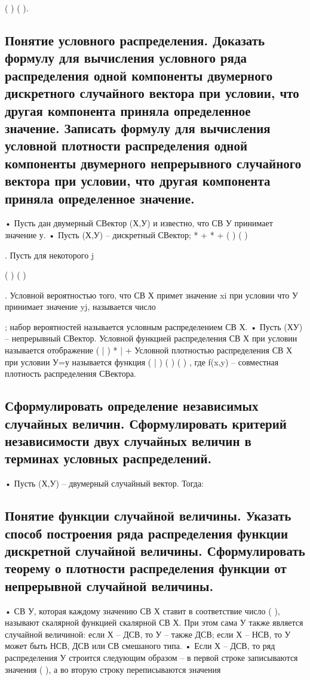 ( )
( ).

\subsection{Понятие условного распределения. Доказать формулу для вычисления условного ряда распределения одной компоненты двумерного дискретного случайного вектора при условии, что другая компонента приняла определенное значение. Записать формулу для вычисления условной плотности распределения одной компоненты двумерного непрерывного случайного вектора при условии, что другая компонента приняла определенное значение.}

• Пусть дан двумерный СВектор (Х,У) и известно, что СВ У принимает значение у.
• Пусть (Х,У) – дискретный СВектор; *
+ *
+ {( ) (
	)} {
	
}. Пусть для некоторого j

{
	
}
{( ) (
	)}
{
}



. Условной вероятностью того, что СВ Х примет значение xi при условии что У принимает
значение yj, называется число


; набор вероятностей называется условным распределением СВ Х.
• Пусть (ХУ) – непрерывный СВектор. Условной функцией распределения СВ Х при условии называется отображение
( | )
* | + Условной плотностью распределения СВ Х при условии У=у называется функция
( | )
( )
( )
, где f(x,y) – совместная
плотность распределения СВектора.

\subsection{Сформулировать определение независимых случайных величин. Сформулировать критерий независимости двух случайных величин в терминах условных распределений.}

• Пусть (Х,У) – двумерный случайный вектор. Тогда:


\subsection{Понятие функции случайной величины. Указать способ построения ряда распределения функции дискретной случайной величины. Сформулировать теорему о плотности распределения функции от непрерывной случайной величины.}

• СВ У, которая каждому значению СВ Х ставит в соответствие число ( ), называют скалярной функцией скалярной СВ Х. При этом
сама У также является случайной величиной: если Х – ДСВ, то У – также ДСВ; если Х – НСВ, то У может быть НСВ, ДСВ или СВ смешаного
типа.
• Если Х – ДСВ, то ряд распределения У строится следующим образом – в первой строке записываются значения (
), а во вторую
строку переписываются значения

